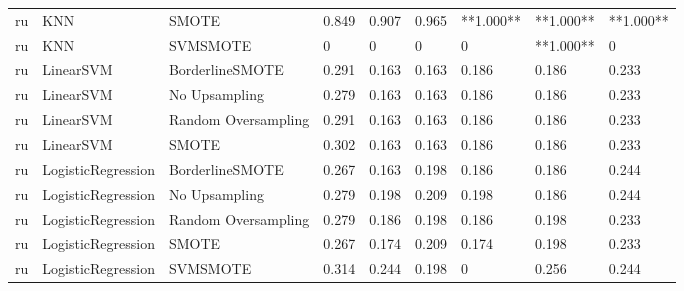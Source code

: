 \begin{tabular}{lllllllll}
      ru &                          KNN &               SMOTE & 0.849 &                     0.907 &                 0.965 &              **1.000** &                               **1.000** & **1.000** \\
      ru &                          KNN &            SVMSMOTE &     0 &                         0 &                     0 &                      0 &                               **1.000** &         0 \\
      ru &                    LinearSVM &     BorderlineSMOTE & 0.291 &                     0.163 &                 0.163 &                  0.186 &                                   0.186 &     0.233 \\
      ru &                    LinearSVM &       No Upsampling & 0.279 &                     0.163 &                 0.163 &                  0.186 &                                   0.186 &     0.233 \\
      ru &                    LinearSVM & Random Oversampling & 0.291 &                     0.163 &                 0.163 &                  0.186 &                                   0.186 &     0.233 \\
      ru &                    LinearSVM &               SMOTE & 0.302 &                     0.163 &                 0.163 &                  0.186 &                                   0.186 &     0.233 \\
      ru &           LogisticRegression &     BorderlineSMOTE & 0.267 &                     0.163 &                 0.198 &                  0.186 &                                   0.186 &     0.244 \\
      ru &           LogisticRegression &       No Upsampling & 0.279 &                     0.198 &                 0.209 &                  0.198 &                                   0.186 &     0.244 \\
      ru &           LogisticRegression & Random Oversampling & 0.279 &                     0.186 &                 0.198 &                  0.186 &                                   0.198 &     0.233 \\
      ru &           LogisticRegression &               SMOTE & 0.267 &                     0.174 &                 0.209 &                  0.174 &                                   0.198 &     0.233 \\
      ru &           LogisticRegression &            SVMSMOTE & 0.314 &                     0.244 &                 0.198 &                      0 &                                   0.256 &     0.244 \\

\end{tabular}
